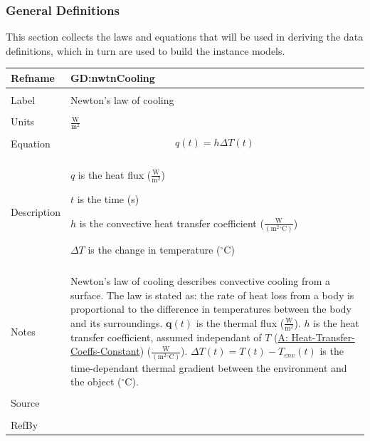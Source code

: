 \documentclass[12pt]{article}
\begin{document}
\subsubsection{General Definitions}
\label{Sec:GDs}
This section collects the laws and equations that will be used in deriving the data definitions, which in turn are used to build the instance models.
~\newline
\noindent \begin{minipage}{\textwidth}
\begin{tabular}{p{} p{}}
\toprule \textbf{Refname} & \textbf{GD:nwtnCooling}
\label{GD:nwtnCooling}
\\ \midrule \\
Label & Newton's law of cooling
\\ \midrule \\
Units & $\frac{\text{W}}{\text{m}^{2}}$
\\ \midrule \\
Equation & \begin{dmath}
           q\left(t\right)=h ΔT\left(t\right)
           \end{dmath}
\\ \midrule \\
Description & \begin{symbDescription}
              \item{$q$ is the heat flux ($\frac{\text{W}}{\text{m}^{2}}$)}
              \item{$t$ is the time (s)}
              \item{$h$ is the convective heat transfer coefficient ($\frac{\text{W}}{(\text{m}^{2}{}^{\circ}\text{C})}$)}
              \item{$ΔT$ is the change in temperature (${}^{\circ}$C)}
              \end{symbDescription}
\\ \midrule \\
Notes & Newton's law of cooling describes convective cooling from a surface. The law is stated as: the rate of heat loss from a body is proportional to the difference in temperatures between the body and its surroundings. $\mathbf{q}\left(t\right)$ is the thermal flux ($\frac{\text{W}}{\text{m}^{2}}$). $h$ is the heat transfer coefficient, assumed independant of $T$ (\hyperref[A:Heat-Transfer-Coeffs-Constant]{A: Heat-Transfer-Coeffs-Constant}) ($\frac{\text{W}}{(\text{m}^{2}{}^{\circ}\text{C})}$). $ΔT\left(t\right)=T\left(t\right)-{T_{env}}\left(t\right)$ is the time-dependant thermal gradient between the environment and the object (${}^{\circ}$C).
\\ \midrule \\
Source & \cite{incroperaEtAl2007}
\\ \midrule \\
RefBy & 
\\ \bottomrule \end{tabular}
\end{minipage}\\
\end{document}
